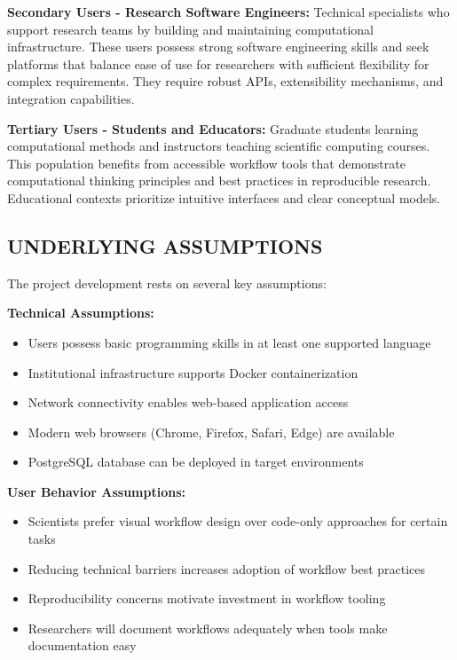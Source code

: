\documentclass[12pt]{article}
\begin{document}
\hspace{\parindent}\textbf{Secondary Users - Research Software Engineers:} Technical specialists who support research teams by building and maintaining computational infrastructure. These users possess strong software engineering skills and seek platforms that balance ease of use for researchers with sufficient flexibility for complex requirements. They require robust APIs, extensibility mechanisms, and integration capabilities.

\hspace{\parindent}\textbf{Tertiary Users - Students and Educators:} Graduate students learning computational methods and instructors teaching scientific computing courses. This population benefits from accessible workflow tools that demonstrate computational thinking principles and best practices in reproducible research. Educational contexts prioritize intuitive interfaces and clear conceptual models.

\subsection{UNDERLYING ASSUMPTIONS}

\hspace{\parindent}The project development rests on several key assumptions:

\textbf{Technical Assumptions:}
\begin{itemize}
    \item Users possess basic programming skills in at least one supported language
    \item Institutional infrastructure supports Docker containerization
    \item Network connectivity enables web-based application access
    \item Modern web browsers (Chrome, Firefox, Safari, Edge) are available
    \item PostgreSQL database can be deployed in target environments
\end{itemize}

\textbf{User Behavior Assumptions:}
\begin{itemize}
    \item Scientists prefer visual workflow design over code-only approaches for certain tasks
    \item Reducing technical barriers increases adoption of workflow best practices
    \item Reproducibility concerns motivate investment in workflow tooling
    \item Researchers will document workflows adequately when tools make documentation easy
\end{itemize}
\end{document}
